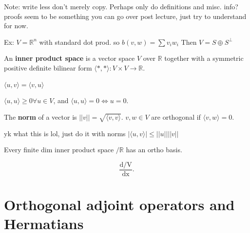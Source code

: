 \documentclass[12pt,oneside]{report}
\begin{document}
Note: write less don't merely copy. Perhaps only do definitions and misc. info? proofs seem to be something you can go over post lecture, just try to understand for now. 


Ex: \( V=\mathbb{R}^n \) with standard dot prod. so \( b(v,w) = \sum v_i w_i \) Then \( V= S \oplus S^\perp \)


\begin{definition}
  An \textbf{inner product space} is a vector space \( V \) over \( \mathbb{R} \) together with a symmetric positive definite bilinear form \( \langle *,*\rangle: V \times V \to  \mathbb{R} \).
\end{definition}

\begin{definition}
  \( \langle u,v \rangle =\langle v,u \rangle \)
\end{definition}

\begin{definition}
  \( \langle u,u \rangle \ge  0 \forall u \in  V \), and \( \langle u,u \rangle=0 \iff u=0 \).
\end{definition}

\begin{definition}[norm]
  The \textbf{norm} of a vector is \( | | v | | = \sqrt{\langle v,v\rangle}  \). \(v,w \in V \) are orthogonal if \( \langle v,w \rangle =0 \). 
\end{definition}

\begin{theorem}
  yk what this is lol, just do it with norms \( |\langle u , v \rangle | \le | | u | | | | v | | \)
\end{theorem}

\begin{theorem}
  Every finite dim inner product space \( / \mathbb{R} \) has an ortho basis.
\end{theorem}

\[
  \frac{\mathrm{d/V}}{\mathrm{dx}} 
.\]



\section{Orthogonal adjoint operators and Hermatians}
\end{document}
